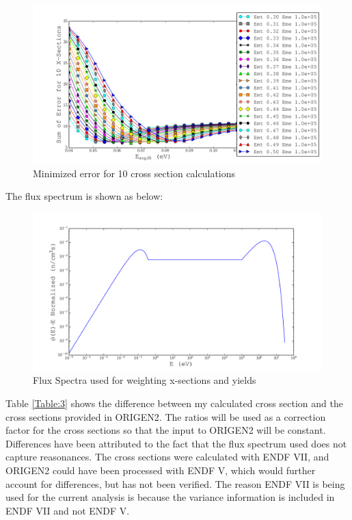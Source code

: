 \documentclass[11pt,notitlepage]{article}
\begin{document}
\begin{todolist}
  \begin{figure}[H]
    \begin{center}
      \includegraphics[width=0.77\columnwidth]{../Weighting/Reduce_Err/E0_vs_SumErr_third.pdf}
      \vspace{-5mm}
      \caption{Minimized error for 10 cross section calculations}
      \label{fig:err}
    \end{center}
  \end{figure}
  
  The flux spectrum is shown as below:

  \begin{figure}[H]
    \begin{center}
      \includegraphics[width=0.77\columnwidth]{../Weighting/Flux_Spectra.pdf}
      \vspace{-5mm}
      \caption{Flux Spectra used for weighting x-sections and yields}
      \label{fig:Flux}
    \end{center}
  \end{figure}

  Table \ref{Table:3} shows the difference between my calculated cross
  section and the cross sections provided in ORIGEN2.
  The ratios will be used as a correction factor for the cross sections
  so that the input to ORIGEN2 will be constant.
  Differences
  have been attributed to the fact that the flux spectrum used
  does not capture reasonances. The cross sections were calculated
  with ENDF VII, and ORIGEN2 could have been processed with ENDF V,
  which would further account for differences, but has not been
  verified. The reason ENDF VII is being used for the current
  analysis is because the variance information is included
  in ENDF VII and not ENDF V.



\end{todolist}
\end{document}

